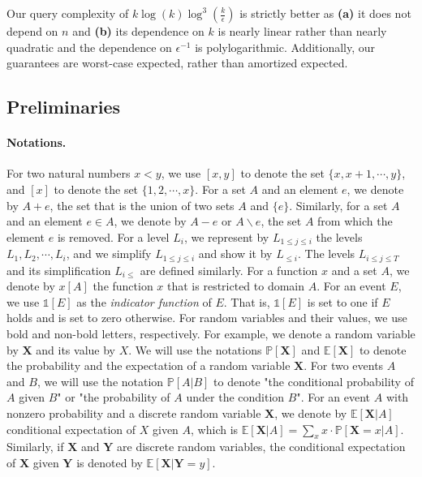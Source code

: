 \documentclass[11pt]{article}
\renewcommand{\Pr}[1]{\ensuremath{\mathbb{P}\left[#1\right]}}
\newcommand{\Ex}[1]{\ensuremath{\mathbb{E}\left[#1\right]}}
\newcommand{\ind}[1]{\ensuremath{\mathds{1}\left[#1\right]}}
\begin{document}
Our query complexity of $k\log(k)\log^{3}(\frac{k}{\epsilon})$ is strictly better as
\textbf{(a)} it does not depend on $n$ and \textbf{(b)} its dependence
on $k$ is nearly linear rather than nearly quadratic and the dependence on $\epsilon^{-1}$ is polylogarithmic. Additionally, our guarantees are worst-case expected, rather than amortized expected.


\subsection{Preliminaries}
\label{sec:prelim}
\paragraph{Notations.}
For two natural numbers $x < y$, we use $[x, y]$ to denote the set $\{x,x+1,\cdots,y\}$, and $[x]$ to denote the set $\{1,2,\cdots,x\}$. 
For a set $A$ and an element $e$, we denote by $A+e$, the set that is the union of two sets $A$ and $\{e\}$. 
Similarly, for a set $A$ and an element $e \in A$, we denote by $A - e$ or $A \backslash e$, the set $A$ from which the element $e$ is removed. 
For a level $L_{i}$, we represent by $L_{1 \le j \le i}$ the levels $L_{1}, L_2,\cdots, L_i$, and we simplify $L_{1 \le j \le i}$ and show it by $L_{\le i}$. The levels $L_{i \le j \le T}$ and its simplification $L_{ i \le }$ are defined similarly. 
For a function $x$ and a set $A$, we denote by $x[A]$ the function $x$ that is restricted to domain $A$.
For an event $E$, we use $\ind{E}$ as the \emph{indicator function} of $E$. That is, $\ind{E}$ is set to one if $E$ holds and is set to zero otherwise. 
For random variables and their values, we use bold and non-bold letters, respectively. For example, we denote a random variable by $\textbf{X}$ and its value by $X$. 
We will use the notations $\Pr{\textbf{X}}$ and $\Ex{\textbf{X}}$ to denote the probability and the expectation of a random variable $\textbf{X}$. 
For two events $A$ and $B$, we will use the notation $\Pr{A|B}$ 
to denote "the conditional probability of $A$ given $B$" or "the probability of $A$ under the condition $B$".
For an event $A$ with nonzero probability and a discrete random variable $\textbf{X}$, we denote by $\Ex{\textbf{X}|A}$ conditional expectation of $X$ given $A$, which is $\Ex{\textbf{X} | A} = \sum_{x} x\cdot \Pr{\textbf{X} = x | A}$. 
Similarly, if $\textbf{X}$ and $\textbf{Y}$ are discrete random variables, 
the conditional expectation of $\textbf{X}$ given $\textbf{Y}$ is denoted by $\Ex{\textbf{X} | \textbf{Y} = y}$. 
\end{document}
